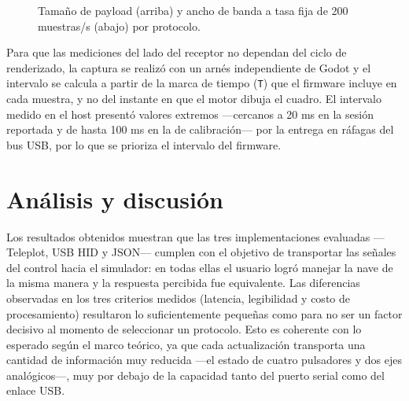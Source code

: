 \documentclass[journal]{IEEEtran}
\begin{document}
\begin{figure}[htbp]
    \centering
    \caption{Tamaño de payload (arriba) y ancho de banda a tasa fija de 200 muestras/s (abajo) por protocolo.}
    \label{fig:cuantitativa}
\end{figure}

Para que las mediciones del lado del receptor no dependan del ciclo de renderizado, la captura se realizó con un arnés independiente de Godot y el intervalo se calcula a partir de la marca de tiempo (\texttt{T}) que el firmware incluye en cada muestra, y no del instante en que el motor dibuja el cuadro. El intervalo medido en el host presentó valores extremos ---cercanos a 20 ms en la sesión reportada y de hasta 100 ms en la de calibración--- por la entrega en ráfagas del bus USB, por lo que se prioriza el intervalo del firmware.




\section{Análisis y discusión}

Los resultados obtenidos muestran que las tres implementaciones evaluadas ---Teleplot, USB HID y JSON--- cumplen con el objetivo de transportar las señales del control hacia el simulador: en todas ellas el usuario logró manejar la nave de la misma manera y la respuesta percibida fue equivalente. Las diferencias observadas en los tres criterios medidos (latencia, legibilidad y costo de procesamiento) resultaron lo suficientemente pequeñas como para no ser un factor decisivo al momento de seleccionar un protocolo. Esto es coherente con lo esperado según el marco teórico, ya que cada actualización transporta una cantidad de información muy reducida ---el estado de cuatro pulsadores y dos ejes analógicos---, muy por debajo de la capacidad tanto del puerto serial como del enlace USB.
\end{document}
